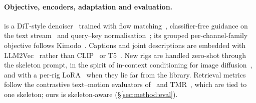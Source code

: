\paragraph{Objective, encoders, adaptation and evaluation.} \method{} is a DiT-style
denoiser~\citep{peebles2023dit} trained with flow matching~\citep{lipman2023flow,liu2023rectified},
classifier-free guidance on the text stream~\citep{ho2022cfg} and query--key
normalisation~\citep{dehghani2023vit22b}; its grouped per-channel-family objective follows
Kimodo~\citep{rempe2026kimodo}. Captions and joint descriptions are embedded with
LLM2Vec~\citep{behnamghader2024llm2vec} rather than CLIP~\citep{radford2021clip} or
T5~\citep{raffel2020t5}. New rigs are handled zero-shot through the skeleton prompt, in the spirit of
in-context conditioning for image diffusion~\citep{wang2023promptdiffusion}, and with a per-rig
LoRA~\citep{hu2022lora} when they lie far from the library. Retrieval metrics follow the contrastive text--motion evaluators
of~\citet{guo2022generating} and TMR~\citep{petrovich2023tmr}, which are tied to one skeleton; ours
is skeleton-aware (\S\ref{sec:method:eval}).

